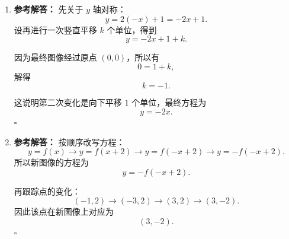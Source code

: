 \documentclass[11pt,a4paper,fontset=fandol]{ctexart}
\newenvironment{solution}{\par\noindent\textbf{参考解答：}}{\hfill$\square$\par}
\begin{document}
\begin{enumerate}
\begin{solution}
  过程 1：
  \[
  y=f(x) \rightarrow y=-f(-x) \rightarrow y=-f(-x)+3.
  \]

  过程 2：
  \[
  y=f(x) \rightarrow y=f(x)+3 \rightarrow y=-(f(-x)+3)=-f(-x)-3.
  \]

  两个结果一般不同，因为关于原点对称既涉及横坐标变号，又涉及函数值变号，与竖直平移交换顺序后常数项会改变符号。
  \end{solution}

  \item \begin{solution}
  先关于 \(y\) 轴对称：
  \[
  y=2(-x)+1=-2x+1.
  \]
  设再进行一次竖直平移 $k$ 个单位，得到
  \[
  y=-2x+1+k.
  \]

  因为最终图像经过原点 \((0,0)\)，所以有
  \[
  0=1+k,
  \]
  解得
  \[
  k=-1.
  \]

  这说明第二次变化是向下平移 $1$ 个单位，最终方程为
  \[
  \boxed{y=-2x}.
  \]
  \end{solution}

  \item \begin{solution}
  按顺序改写方程：
  \[
  y=f(x) \rightarrow y=f(x+2) \rightarrow y=f(-x+2) \rightarrow y=-f(-x+2).
  \]
  所以新图像的方程为
  \[
  \boxed{y=-f(-x+2)}.
  \]

  再跟踪点的变化：
  \[
  (-1,2) \rightarrow (-3,2) \rightarrow (3,2) \rightarrow (3,-2).
  \]
  因此该点在新图像上对应为
  \[
  \boxed{(3,-2)}.
  \]
  \end{solution}
\end{enumerate}
\end{document}
